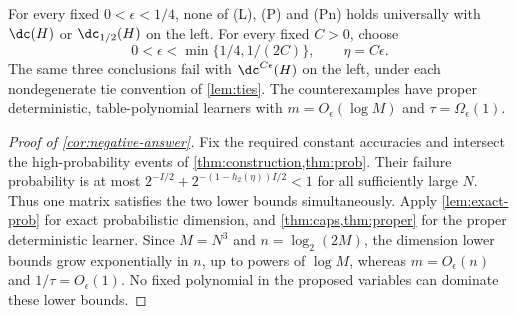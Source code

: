 \begin{corollary}\label{cor:negative-answer}
For every fixed $0<\epsilon<1/4$, none of (L), (P) and (Pn) holds universally with $\dc(H)$ or $\dc_{1/2}(H)$ on the left. For every fixed $C>0$, choose
\[
 0<\epsilon<\min\{1/4,1/(2C)\},\qquad\eta=C\epsilon.
\]
The same three conclusions fail with $\dc^{C\epsilon}(H)$ on the left, under each nondegenerate tie convention of \cref{lem:ties}. The counterexamples have proper deterministic, table-polynomial learners with $m=O_\epsilon(\log M)$ and $\tau=\Omega_\epsilon(1)$.
\end{corollary}

\begin{proof}[Proof of \cref{cor:negative-answer}]
Fix the required constant accuracies and intersect the high-probability events of \cref{thm:construction,thm:prob}. Their failure probability is at most $2^{-I/2}+2^{-(1-h_2(\eta))I/2}<1$ for all sufficiently large $N$. Thus one matrix satisfies the two lower bounds simultaneously. Apply \cref{lem:exact-prob} for exact probabilistic dimension, and \cref{thm:caps,thm:proper} for the proper deterministic learner. Since $M=N^3$ and $n=\log_2(2M)$, the dimension lower bounds grow exponentially in $n$, up to powers of $\log M$, whereas $m=O_\epsilon(n)$ and $1/\tau=O_\epsilon(1)$. No fixed polynomial in the proposed variables can dominate these lower bounds.
\end{proof}
